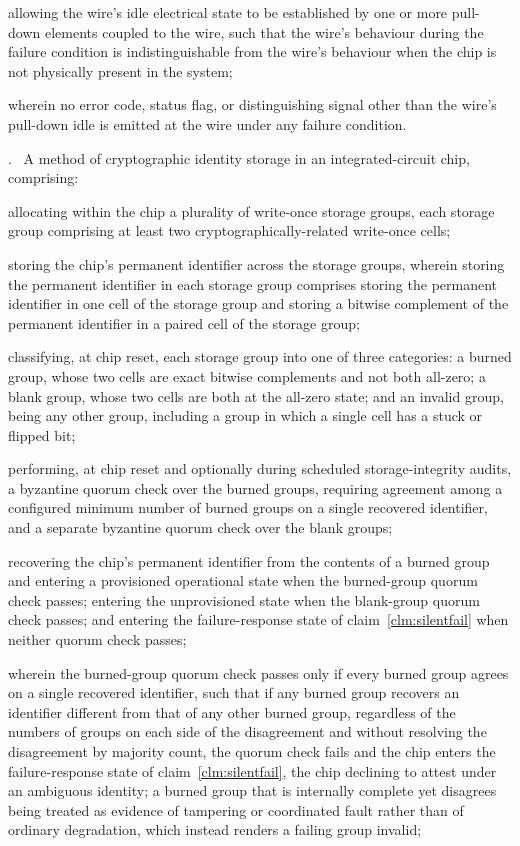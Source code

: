 \documentclass[12pt,letterpaper]{article}
\newcounter{para}
\newcounter{claim}
\newcommand{\claim}[1]{\medskip\par\refstepcounter{claim}\noindent\arabic{claim}.~\label{clm:#1}\ignorespaces}
\newcommand{\clm}[1]{claim~\ref{clm:#1}}
\newcounter{fig}
\begin{document}
allowing the wire's idle electrical state to be established by one or more pull-down elements coupled to the wire, such that the wire's behaviour during the failure condition is indistinguishable from the wire's behaviour when the chip is not physically present in the system;

wherein no error code, status flag, or distinguishing signal other than the wire's pull-down idle is emitted at the wire under any failure condition.

\claim{storage} A method of cryptographic identity storage in an integrated-circuit chip, comprising:

allocating within the chip a plurality of write-once storage groups, each storage group comprising at least two cryptographically-related write-once cells;

storing the chip's permanent identifier across the storage groups, wherein storing the permanent identifier in each storage group comprises storing the permanent identifier in one cell of the storage group and storing a bitwise complement of the permanent identifier in a paired cell of the storage group;

classifying, at chip reset, each storage group into one of three categories: a burned group, whose two cells are exact bitwise complements and not both all-zero; a blank group, whose two cells are both at the all-zero state; and an invalid group, being any other group, including a group in which a single cell has a stuck or flipped bit;

performing, at chip reset and optionally during scheduled storage-integrity audits, a byzantine quorum check over the burned groups, requiring agreement among a configured minimum number of burned groups on a single recovered identifier, and a separate byzantine quorum check over the blank groups;

recovering the chip's permanent identifier from the contents of a burned group and entering a provisioned operational state when the burned-group quorum check passes; entering the unprovisioned state when the blank-group quorum check passes; and entering the failure-response state of \clm{silentfail} when neither quorum check passes;

wherein the burned-group quorum check passes only if every burned group agrees on a single recovered identifier, such that if any burned group recovers an identifier different from that of any other burned group, regardless of the numbers of groups on each side of the disagreement and without resolving the disagreement by majority count, the quorum check fails and the chip enters the failure-response state of \clm{silentfail}, the chip declining to attest under an ambiguous identity; a burned group that is internally complete yet disagrees being treated as evidence of tampering or coordinated fault rather than of ordinary degradation, which instead renders a failing group invalid;
\end{document}

